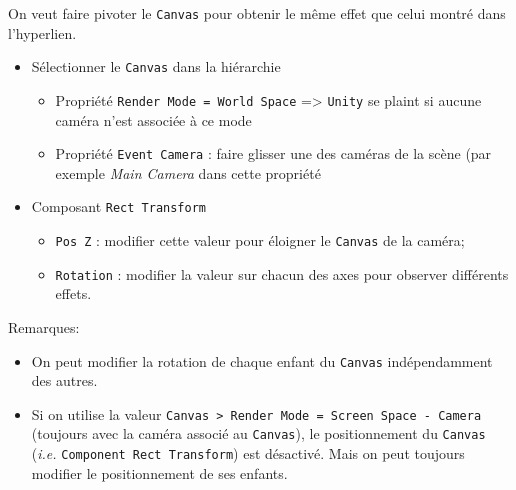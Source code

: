 \documentclass[a4paper,10pt]{article}
\newenvironment{solution}%
{\begin{tcolorbox}[breakable,colback=red!5!white,colframe=red!75!black,title=Solution]}%
{\end{tcolorbox}}
\begin{document}
\ifversionenseignant
\begin{solution}
On veut faire pivoter le \texttt{Canvas} pour obtenir le même effet que celui montré dans l'hyperlien.

\begin{itemize}
	\item Sélectionner le \texttt{Canvas} dans la hiérarchie
	\begin{itemize}
		\item Propriété \texttt{Render Mode = World Space} => \texttt{Unity} se plaint si aucune caméra n'est associée à ce mode
		\item Propriété \texttt{Event Camera} : faire glisser une des caméras de la scène (par exemple \textit{Main Camera} dans cette propriété
\end{itemize}		
	\item Composant \texttt{Rect Transform}
	\begin{itemize}	
	\item \texttt{Pos Z} : modifier cette valeur pour éloigner le \texttt{Canvas} de la caméra;
	\item \texttt{Rotation} : modifier la valeur sur chacun des axes pour observer différents effets.
\end{itemize}		
\end{itemize}

Remarques:
	\begin{itemize}	
	 \item On peut modifier la rotation de chaque enfant du \texttt{Canvas} indépendamment des autres.
	 \item Si on utilise la valeur \texttt{Canvas > Render Mode = Screen Space - Camera} (toujours avec la caméra associé au \texttt{Canvas}), le positionnement du \texttt{Canvas} (\textit{i.e.} \texttt{Component Rect Transform}) est désactivé. Mais on peut toujours modifier le positionnement de ses enfants.
	
\end{itemize}


\end{solution}
\fi 
\end{document}
